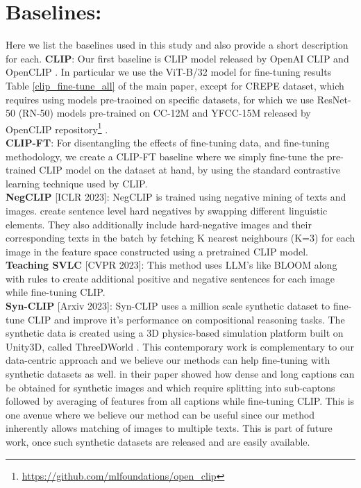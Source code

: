 \documentclass[11pt]{article}
\begin{document}
\section{Baselines:}
\label{baselines}
Here we list the baselines used in this study and also provide a short description for each.
\noindent \textbf{CLIP}\citep{radford2021learning}: Our first baseline is CLIP model released by OpenAI CLIP\citep{radford2021learning} and OpenCLIP \citep{Ilharco_OpenCLIP_2021}. In particular we use the ViT-B/32 model for fine-tuning results Table \ref{clip_fine-tune_all} of the main paper, except for CREPE dataset, which requires using models pre-traoined on specific datasets, for which we use ResNet-50 (RN-50) models pre-trained on CC-12M and YFCC-15M released by OpenCLIP repository\footnote{\url{https://github.com/mlfoundations/open_clip}} \citep{Ilharco_OpenCLIP_2021}.\\
\noindent \textbf{CLIP-FT}: For disentangling the effects of fine-tuning data, and fine-tuning methodology, we create a CLIP-FT baseline where we simply fine-tune the pre-trained CLIP model on the dataset at hand, by using the standard contrastive learning technique used by CLIP. \\
\noindent \textbf{NegCLIP}\citep{yuksekgonul2022and} [ICLR 2023]: NegCLIP is trained using negative mining of texts and images. \citet{yuksekgonul2022and} create sentence level hard negatives by swapping different linguistic elements. They also additionally include hard-negative images and their corresponding texts in the batch by fetching K nearest neighbours (K=3) for each image in the feature space constructed using a pretrained CLIP model.\\
\noindent \textbf{Teaching SVLC}\citep{doveh2023teaching} [CVPR 2023]: This method uses LLM's like BLOOM \citep{bloom} along with rules to create additional positive and negative sentences for each image while fine-tuning CLIP.\\
\noindent \textbf{Syn-CLIP}\citep{cascantebonilla2023going} [Arxiv 2023]: Syn-CLIP uses a million scale synthetic dataset to fine-tune CLIP and improve it's performance on compositional reasoning tasks. The synthetic data is created using a 3D physics-based simulation platform built on Unity3D, called ThreeDWorld \citep{gan2021threedworld}. This contemporary work is complementary to our data-centric approach and we believe our methods can help fine-tuning with synthetic datasets as well. \citet{cascantebonilla2023going} in their paper showed how dense and long captions can be obtained for synthetic images and which require splitting into sub-captons followed by averaging of features from all captions while fine-tuning CLIP. This is one avenue where we believe our method can be useful since our method inherently allows matching of images to multiple texts. This is part of future work, once such synthetic datasets are released and are easily available. \\
\end{document}
